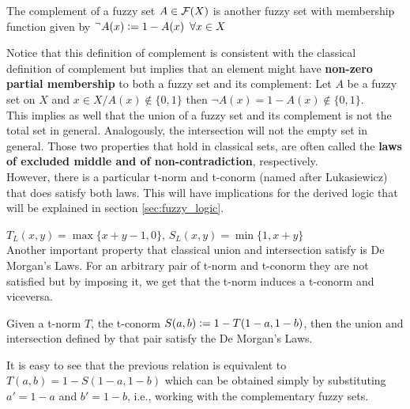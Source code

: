 \begin{definition}[Complement]
    The complement of a fuzzy set $A\in \mathcal{F}(X)$ is another fuzzy set with membership function given by $^\lnot A(x) \coleq 1 - A(x) \forall x\in X$
\end{definition}

Notice that this definition of complement is consistent with the classical definition of complement but implies that an element might have \textbf{non-zero partial membership} to both a fuzzy set and its complement: Let $A$ be a fuzzy set on $X$ and $x \in X / A(x)\notin \{0,1\}$ then $\lnot A(x)= 1 - A(x) \notin \{0,1\}$.\\

This implies as well that the union of a fuzzy set and its complement is not the total set in general. Analogously, the intersection will not the empty set in general. Those two properties that hold in classical sets, are often called the \textbf{laws of excluded middle and of non-contradiction}, respectively.\\

However, there is a particular t-norm and t-conorm (named after Lukasiewicz) that does satisfy both laws. This will have implications for the derived logic that will be explained in section \ref{sec:fuzzy_logic}. 

\hspace{10em}$T_L(x,y)=\max\{x+y-1,0\},\, S_L(x,y)=\min\{1,x+y\}$\\

Another important property that classical union and intersection satisfy is De Morgan's Laws. For an arbitrary pair of t-norm and t-conorm they are not satisfied but by imposing it, we get that the t-norm induces a t-conorm and viceversa.

\begin{proposition}
  Given a t-norm $T$, the t-conorm $S(a,b)\mathrel{\mathop:}= 1 - T(1-a, 1-b)$, then the union and intersection defined by that pair satisfy the De Morgan's Laws.
\end{proposition}
\begin{remark}
  It is easy to see that the previous relation is equivalent to $T(a,b) = 1-S(1-a, 1-b)$ which can be obtained simply by substituting $a'=1-a$ and $b'=1-b$, i.e., working with the complementary fuzzy sets.
\end{remark}

